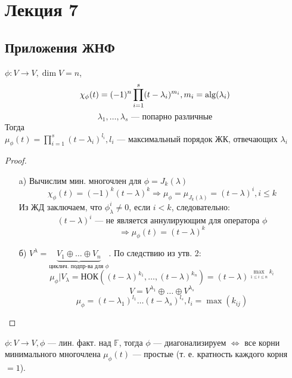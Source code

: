 \section{Лекция 7}
\subsection{Приложения ЖНФ}
\begin{theorem}
\label{theorem:07_1}
    $\phi \colon V \rightarrow V, \dim V = n$,
    \[
        \chi_\phi(t) = (-1)^{n} \prod_{i = 1}^{s} (t - \lambda_i)^{m_i}, m_i = \operatorname{alg}(\lambda_i)
    \]
    \[
    \lambda_1, \ldots, \lambda_s \text{ --- попарно различные}
    \]
    Тогда $\mu_\phi(t) = \prod_{i = 1}^{s} (t - \lambda_i)^{l_i}, l_i \text{ --- максимальный порядок ЖК, отвечающих $\lambda_i$}$
\end{theorem}
\begin{proof}
    \begin{itemize}
        \item [a) ] Вычислим мин. многочлен для $\phi = J_k(\lambda)$
            \[
            \chi_\phi(t) = (-1)^{k}(t - \lambda)^{k} \Rightarrow \mu_\phi = \mu_{J_k(\lambda)} = (t - \lambda)^{i}, i \leq k
            \]
            Из ЖД заключаем, что  $\phi_{\lambda}^{i} \neq 0$, если $i < k$, следовательно:
            \[
                (t - \lambda)^{i} \text{ --- не является аннулирующим для оператора $\phi$}
            \]
            \[
            \Rightarrow \mu_\phi(t) = (t - \lambda)^{k}
            \]
        \item [б) ] $V^{\lambda} = \underbrace{V_1 \oplus \ldots \oplus V_n}_{\text{циклич. подпр-ва для $\phi$}}$. По следствию из утв. 2:
            \[
                \mu_{\phi}|V_{\lambda} = \text{НОК}((t - \lambda)^{k_1}, \ldots, (t - \lambda)^{k_n}) = (t - \lambda)^{\underset{1 \leq i \leq n}{\max} k_i}
            \]
            \[
            V = V^{\lambda_1} \oplus \ldots \oplus V^{\lambda_s}
            \]
            \[
            \mu_\phi = (t - \lambda_1)^{l_1} \ldots (t - \lambda_s)^{l_s}, l_i = \max (k_{ij})
            \]
    \end{itemize}
\end{proof}
\begin{consequence}
    $\phi \colon V \rightarrow V, \phi$ --- лин. факт. над $\mathbb{F}$, тогда $\phi$ --- диагонализируем $\iff$ все корни минимального многочлена $\mu_\phi(t)$ --- простые (т. е. кратность каждого корня $= 1$).
\end{consequence}

